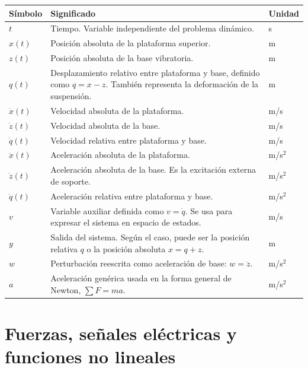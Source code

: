 \documentclass[11pt]{article}
\begin{document}
\begin{center}
\small
\begin{tabular}{>{\raggedright\arraybackslash}p{2.8cm} >{\raggedright\arraybackslash}p{9.2cm} >{\raggedright\arraybackslash}p{2.2cm}}
\toprule
\textbf{S\'imbolo} & \textbf{Significado} & \textbf{Unidad} \\
\midrule
$t$ & Tiempo. Variable independiente del problema din\'amico. & s \\
$x(t)$ & Posici\'on absoluta de la plataforma superior. & m \\
$z(t)$ & Posici\'on absoluta de la base vibratoria. & m \\
$q(t)$ & Desplazamiento relativo entre plataforma y base, definido como $q=x-z$. Tambi\'en representa la deformaci\'on de la suspensi\'on. & m \\
$\dot x(t)$ & Velocidad absoluta de la plataforma. & m/s \\
$\dot z(t)$ & Velocidad absoluta de la base. & m/s \\
$\dot q(t)$ & Velocidad relativa entre plataforma y base. & m/s \\
$\ddot x(t)$ & Aceleraci\'on absoluta de la plataforma. & m/s$^2$ \\
$\ddot z(t)$ & Aceleraci\'on absoluta de la base. Es la excitaci\'on externa de soporte. & m/s$^2$ \\
$\ddot q(t)$ & Aceleraci\'on relativa entre plataforma y base. & m/s$^2$ \\
$v$ & Variable auxiliar definida como $v=\dot q$. Se usa para expresar el sistema en espacio de estados. & m/s \\
$y$ & Salida del sistema. Seg\'un el caso, puede ser la posici\'on relativa $q$ o la posici\'on absoluta $x=q+z$. & m \\
$w$ & Perturbaci\'on reescrita como aceleraci\'on de base: $w=\ddot z$. & m/s$^2$ \\
$a$ & Aceleraci\'on gen\'erica usada en la forma general de Newton, $\sum F = ma$. & m/s$^2$ \\
\bottomrule
\end{tabular}
\end{center}

\section{Fuerzas, se\~nales el\'ectricas y funciones no lineales}
\end{document}
